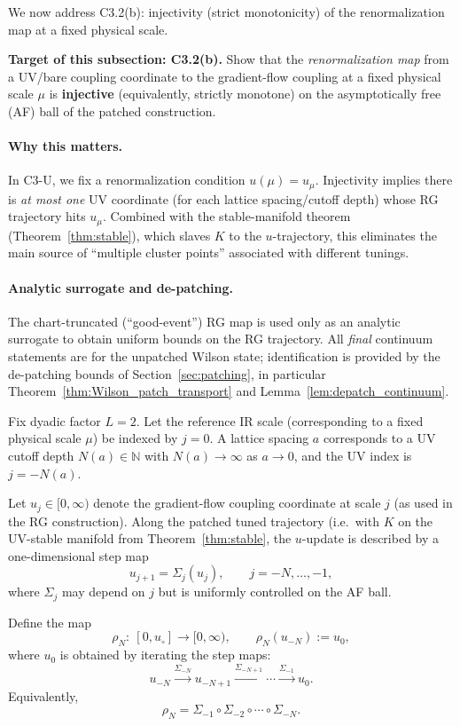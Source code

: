 We now address C3.2(b): injectivity (strict monotonicity) of the renormalization map at a fixed physical scale.

\medskip
\noindent\textbf{Target of this subsection: C3.2(b).}
Show that the \emph{renormalization map} from a UV/bare coupling coordinate to the gradient-flow coupling at a fixed physical scale $\mu$ is
\textbf{injective} (equivalently, strictly monotone) on the asymptotically free (AF) ball of the patched construction.

\paragraph{Why this matters.}
In C3-U, we fix a renormalization condition $u(\mu)=u_\mu$.
Injectivity implies there is \emph{at most one} UV coordinate (for each lattice spacing/cutoff depth) whose RG trajectory hits $u_\mu$.
Combined with the stable-manifold theorem (Theorem~\ref{thm:stable}), which slaves $K$ to the $u$-trajectory, this eliminates the main source of ``multiple cluster points'' associated with different tunings.

\paragraph{Analytic surrogate and de-patching.}
The chart-truncated (``good-event'') RG map is used only as an analytic surrogate to obtain uniform bounds on the RG trajectory.
All \emph{final} continuum statements are for the unpatched Wilson state; identification is provided by the de-patching bounds of
Section~\ref{sec:patching}, in particular Theorem~\ref{thm:Wilson_patch_transport} and Lemma~\ref{lem:depatch_continuum}.

Fix dyadic factor $L=2$. Let the reference IR scale (corresponding to a fixed physical scale $\mu$) be indexed by $j=0$.
A lattice spacing $a$ corresponds to a UV cutoff depth $N(a)\in\mathbb N$ with $N(a)\to\infty$ as $a\to 0$,
and the UV index is $j=-N(a)$.

Let $u_j\in[0,\infty)$ denote the gradient-flow coupling coordinate at scale $j$ (as used in the RG construction).
Along the patched tuned trajectory (i.e.\ with $K$ on the UV-stable manifold from Theorem~\ref{thm:stable}, the $u$-update is described by a one-dimensional step map
\[
u_{j+1}=\Sigma_j(u_j),
\qquad j=-N,\dots,-1,
\]
where $\Sigma_j$ may depend on $j$ but is uniformly controlled on the AF ball.

\begin{definition}\label{def:rhoN}
Define the map
\[
\rho_N:\ [0,u_\circ]\to[0,\infty),
\qquad
\rho_N(u_{-N}) := u_0,
\]
where $u_0$ is obtained by iterating the step maps:
\[
u_{-N}\xrightarrow{\Sigma_{-N}}u_{-N+1}\xrightarrow{\Sigma_{-N+1}}\cdots\xrightarrow{\Sigma_{-1}}u_0.
\]
Equivalently,
\[
\rho_N = \Sigma_{-1}\circ \Sigma_{-2}\circ\cdots\circ \Sigma_{-N}.
\]
\end{definition}

